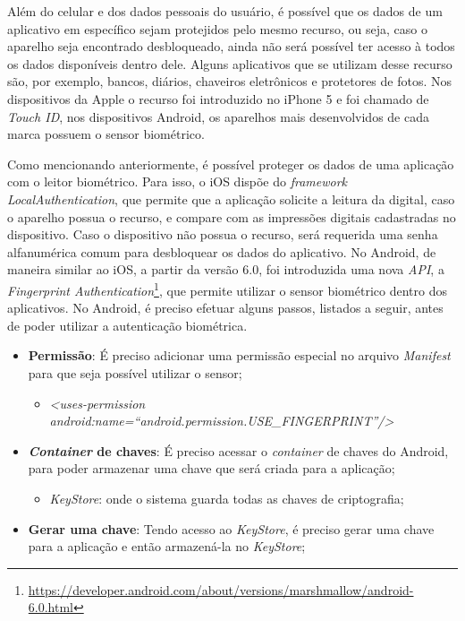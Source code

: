 Além do celular e dos dados pessoais do usuário, é possível que os dados de um aplicativo em específico sejam protejidos pelo mesmo recurso, ou seja, caso o aparelho seja encontrado desbloqueado, ainda não será possível 
ter acesso à todos os dados disponíveis dentro dele. Alguns aplicativos que se utilizam desse recurso são, por exemplo, bancos, diários, chaveiros eletrônicos e protetores de fotos. Nos dispositivos da Apple o recurso 
foi introduzido no iPhone 5 e foi chamado de \textit{Touch ID}, nos dispositivos Android, os aparelhos mais desenvolvidos de cada marca possuem o sensor biométrico. 

Como mencionando anteriormente, é possível proteger os dados de uma aplicação com o leitor biométrico. Para isso, o iOS dispõe do \textit{framework LocalAuthentication}, que permite que a aplicação solicite a leitura da 
digital, caso o aparelho possua o recurso, e compare com as impressões digitais cadastradas no dispositivo. Caso o dispositivo não possua o recurso, será requerida uma senha alfanumérica comum para desbloquear os dados do 
aplicativo. No Android, de maneira similar ao iOS, a partir da versão 6.0, foi introduzida uma nova \textit{API}, a \textit{Fingerprint Authentication}\footnote{\url{https://developer.android.com/about/versions/marshmallow/android-6.0.html}}, 
que permite utilizar o sensor biométrico dentro dos aplicativos. No Android, é preciso efetuar alguns passos, listados a seguir, antes de poder utilizar a autenticação biométrica. 

\begin{itemize}
	\item \textbf{Permissão}: É preciso adicionar uma permissão especial no arquivo \textit{Manifest} para que seja possível utilizar o sensor;
	\begin{itemize}
		\item \textit{<uses-permission android:name=``android.permission.USE\_FINGERPRINT''/>} 
	\end{itemize}
	\item \textbf{\textit{Container} de chaves}: É preciso acessar o \textit{container} de chaves do Android, para poder armazenar uma chave que será criada para a aplicação;
	\begin{itemize}
		\item \textit{KeyStore}: onde o sistema guarda todas as chaves de criptografia;
	\end{itemize}
	\item \textbf{Gerar uma chave}: Tendo acesso ao \textit{KeyStore}, é preciso gerar uma chave para a aplicação e então armazená-la no \textit{KeyStore};
\end{itemize}

